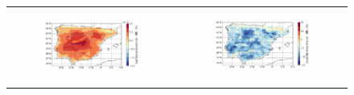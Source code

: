 \begin{figure}[htbp]
\begin{tabular}{cc}
        \begin{subfigure}[b]{0.5\textwidth}
            \caption{}
            \includegraphics[width=\textwidth]{images/chap4/future/reldiffmap_psol_futirr.png}
        \end{subfigure} &
        \begin{subfigure}[b]{0.5\textwidth}
            \caption{}
            \includegraphics[width=\textwidth]{images/chap4/future/reldiffmap_fluxsens_futirr.png}
        \end{subfigure} \\


\end{tabular}
\end{figure}
